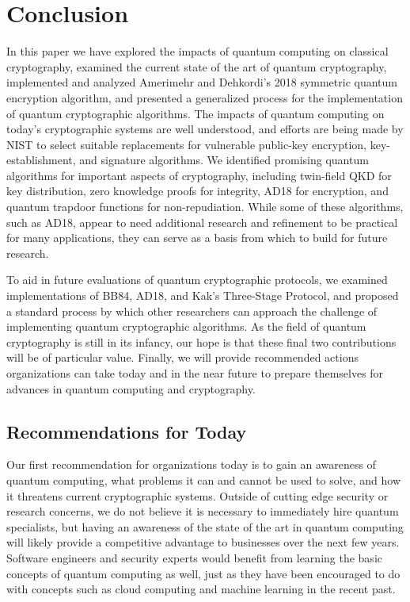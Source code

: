 \documentclass[sigconf]{acmart}
\begin{document}
\section{Conclusion}
In this paper we have explored the impacts of quantum computing on classical cryptography, examined the current state of the art of quantum cryptography, implemented and analyzed Amerimehr and Dehkordi's 2018 symmetric quantum encryption algorithm\cite{amerimehr_quantum_2018}, and presented a generalized process for the implementation of quantum cryptographic algorithms. The impacts of quantum computing on today's cryptographic systems are well understood, and efforts are being made by NIST to select suitable replacements for vulnerable public-key encryption, key-establishment, and signature algorithms\cite{moody_nist_2020, csd_postquantum_2017}. We identified promising quantum algorithms for important aspects of cryptography, including twin-field QKD for key distribution, zero knowledge proofs for integrity, AD18 for encryption, and quantum trapdoor functions for non-repudiation. While some of these algorithms, such as AD18, appear to need additional research and refinement to be practical for many applications, they can serve as a basis from which to build for future research.

To aid in future evaluations of quantum cryptographic protocols, we examined implementations of BB84, AD18, and Kak's Three-Stage Protocol, and proposed a standard process by which other researchers can approach the challenge of implementing quantum cryptographic algorithms. As the field of quantum cryptography is still in its infancy, our hope is that these final two contributions will be of particular value. Finally, we will provide recommended actions organizations can take today and in the near future to prepare themselves for advances in quantum computing and cryptography.

\subsection{Recommendations for Today}
Our first recommendation for organizations today is to gain an awareness of quantum computing, what problems it can and cannot be used to solve, and how it threatens current cryptographic systems. Outside of cutting edge security or research concerns, we do not believe it is necessary to immediately hire quantum specialists, but having an awareness of the state of the art in quantum computing will likely provide a competitive advantage to businesses over the next few years. Software engineers and security experts would benefit from learning the basic concepts of quantum computing as well, just as they have been encouraged to do with concepts such as cloud computing and machine learning in the recent past.
\end{document}
